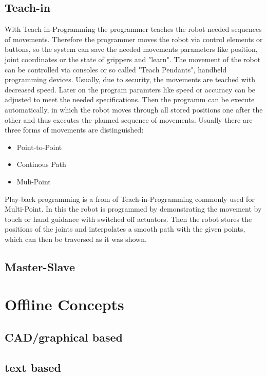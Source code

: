 \documentclass[conference]{IEEEtran}
\begin{document}
    \subsection{Teach-in}
    With Teach-in-Programming the programmer teaches the robot needed sequences of movements. Therefore the programmer moves the robot via control elements or buttons, so the system can save the needed movements parameters like position, joint coordinates or the state of grippers and "learn".  The movement of the robot can be controlled via consoles or so called "Teach Pendants", handheld programming devices. Usually, due to security, the movements are teached with decreased speed. Later on the program paramters like speed or accuracy can be adjusted to meet the needed specifications. Then the programm can be execute automatically, in which the robot moves through all stored positions one after the other and thus executes the planned sequence of movements. %
    Usually there are three forms of movements are distinguished:
    \begin{itemize}
        \item Point-to-Point
        \item Continous Path
        \item Muli-Point
    \end{itemize}

    Play-back programming is a from of Teach-in-Programming commonly used for Multi-Point. In this the robot is programmed by demonstrating the movement by touch or hand guidance with switched off actuators. Then the robot stores the positions of the joints and interpolates a smooth path with the given points, which can then be traversed as it was shown. %

    \subsection{Master-Slave}
    

\section{Offline Concepts}
    \subsection{CAD/graphical based}
    \subsection{text based}
\end{document}
